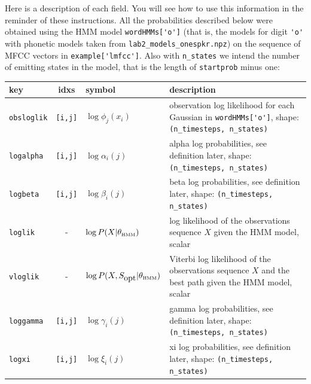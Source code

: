 \documentclass{nada-ten}
\begin{document}
Here is a description of each field. You will see how to use this information in the reminder of these instructions. All the probabilities described below were obtained using the HMM model \verb|wordHMMs['o']| (that is, the models for digit \verb|'o'| with phonetic models taken from \texttt{lab2\_models\_onespkr.npz}) on the sequence of MFCC vectors in \verb|example['lmfcc']|. Also with \texttt{n\_states} we intend the number of emitting states in the model, that is the length of \texttt{startprob} minus one:

\begin{center}
\begin{tabular}{lclp{}}
  key & idxs & symbol & description \\
  \hline
  \texttt{obsloglik} & \texttt{[i,j]} & $\log\phi_j(x_i)$ & observation log likelihood for each Gaussian in \verb|wordHMMs['o']|, shape: \texttt{(n\_timesteps, n\_states)} \\
  \texttt{logalpha} & \texttt{[i,j]} & $\log\alpha_i(j)$ & alpha log probabilities, see definition later, shape: \texttt{(n\_timesteps, n\_states)} \\
  \texttt{logbeta} & \texttt{[i,j]} & $\log\beta_i(j)$ & beta log probabilities, see definition later, shape: \texttt{(n\_timesteps, n\_states)} \\
  \texttt{loglik} & - & $\log P(X|\theta_{\mbox{\tiny HMM}})$ & log likelihood of the observations sequence $X$ given the HMM model, scalar \\
  \texttt{vloglik} & - & $\log P(X,S_{\mbox{opt}}|\theta_{\mbox{\tiny HMM}})$ & Viterbi log likelihood of the observations sequence $X$ and the best path given the HMM model, scalar \\
  \texttt{loggamma} & \texttt{[i,j]} & $\log \gamma_i(j)$ & gamma log probabilities, see definition later, shape: \texttt{(n\_timesteps, n\_states)} \\
  \texttt{logxi} & \texttt{[i,j]} & $\log \xi_i(j)$ & xi log probabilities, see definition later, shape: \texttt{(n\_timesteps, n\_states)} \\
  \hline
\end{tabular}
\end{center}
\vspace{2mm}
\end{document}
